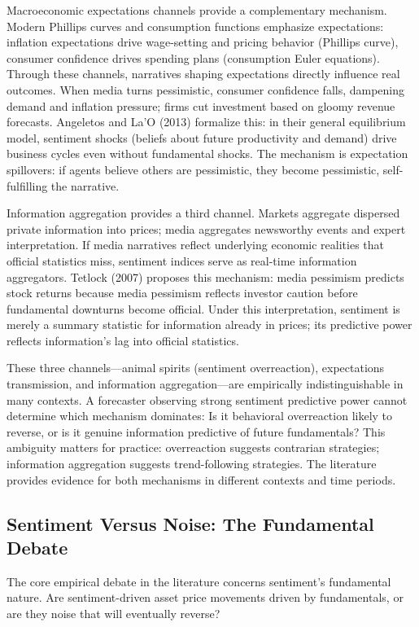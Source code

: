 \documentclass[11pt,twocolumn]{article}
\begin{document}
Macroeconomic expectations channels provide a complementary mechanism. Modern Phillips curves and consumption functions emphasize expectations: inflation expectations drive wage-setting and pricing behavior (Phillips curve), consumer confidence drives spending plans (consumption Euler equations). Through these channels, narratives shaping expectations directly influence real outcomes. When media turns pessimistic, consumer confidence falls, dampening demand and inflation pressure; firms cut investment based on gloomy revenue forecasts. Angeletos and La'O (2013) formalize this: in their general equilibrium model, sentiment shocks (beliefs about future productivity and demand) drive business cycles even without fundamental shocks. The mechanism is expectation spillovers: if agents believe others are pessimistic, they become pessimistic, self-fulfilling the narrative.

Information aggregation provides a third channel. Markets aggregate dispersed private information into prices; media aggregates newsworthy events and expert interpretation. If media narratives reflect underlying economic realities that official statistics miss, sentiment indices serve as real-time information aggregators. Tetlock (2007) proposes this mechanism: media pessimism predicts stock returns because media pessimism reflects investor caution before fundamental downturns become official. Under this interpretation, sentiment is merely a summary statistic for information already in prices; its predictive power reflects information's lag into official statistics.

These three channels---animal spirits (sentiment overreaction), expectations transmission, and information aggregation---are empirically indistinguishable in many contexts. A forecaster observing strong sentiment predictive power cannot determine which mechanism dominates: Is it behavioral overreaction likely to reverse, or is it genuine information predictive of future fundamentals? This ambiguity matters for practice: overreaction suggests contrarian strategies; information aggregation suggests trend-following strategies. The literature provides evidence for both mechanisms in different contexts and time periods.

\subsection{Sentiment Versus Noise: The Fundamental Debate}

The core empirical debate in the literature concerns sentiment's fundamental nature. Are sentiment-driven asset price movements driven by fundamentals, or are they noise that will eventually reverse?
\end{document}
